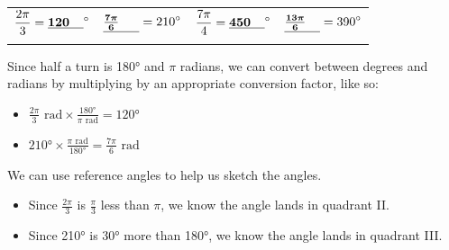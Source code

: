 \documentclass[main]{subfiles}
\begin{document}
\begin{enumerate}[resume]
  {
    \newcommand{\drawcircle}{
      \begin{tikzpicture}[scale=0.9]
        \begin{axis}[width=2in, height=2in, axis equal=true,
        xtick=\empty, ytick=\empty]
          \addplot+[domain=0:360] ({cos(x)}, {sin(x)});
        \end{axis}
      \end{tikzpicture}
    }

    \begin{tabular}{cccc}
      $\displaystyle \frac{2\pi}{3} = \fitb{1cm}{120}^\circ$ &
      $\fitb{1cm}{\frac{7\pi}{6}} = \displaystyle 210^\circ$ & 
      $\displaystyle \frac{7\pi}{4} = \fitb{1cm}{450}^\circ$ &
      $\fitb{1cm}{\frac{13\pi}{6}} = \displaystyle 390^\circ$ \\
      \probonly{\drawcircle}
      \solonly{
        \begin{tikzangle}[angle=2*pi/3]
        \end{tikzangle}        
      }
      &
      \probonly{\drawcircle}
      \solonly{
        \begin{tikzangle}[angle=7*pi/6]

        \end{tikzangle}
      } &
      \probonly{\drawcircle}
      \solonly{
        \begin{tikzangle}[angle=7*pi/4]

        \end{tikzangle}        
      } &
      \probonly{\drawcircle}
      \solonly{
        \begin{tikzangle}[angle=13*pi/6]

        \end{tikzangle}
      }
    \end{tabular}
  }

\begin{solution}
    Since half a turn is \ang{180} and $\pi$ radians, we can convert between degrees and radians by multiplying by an appropriate conversion factor, like so:
    \begin{itemize}
        \item $\frac{2\pi}{3}\text{ rad} \times \frac{\ang{180}}{\pi\text{ rad}} = \ang{120}$
        \item $\ang{210} \times \frac{\pi\text{ rad}}{\ang{180}} = \frac{7\pi}{6}\text{ rad}$
    \end{itemize}
    We can use reference angles to help us sketch the angles.
    \begin{itemize}
    \item Since $\frac{2\pi}{3}$ is $\frac{\pi}{3}$ less than $\pi$, we know the angle lands in quadrant II.
    \item Since \ang{210} is \ang{30} more than \ang{180}, we know the angle lands in quadrant III.
    \end{itemize}
\end{solution}


\end{enumerate}
\end{document}
